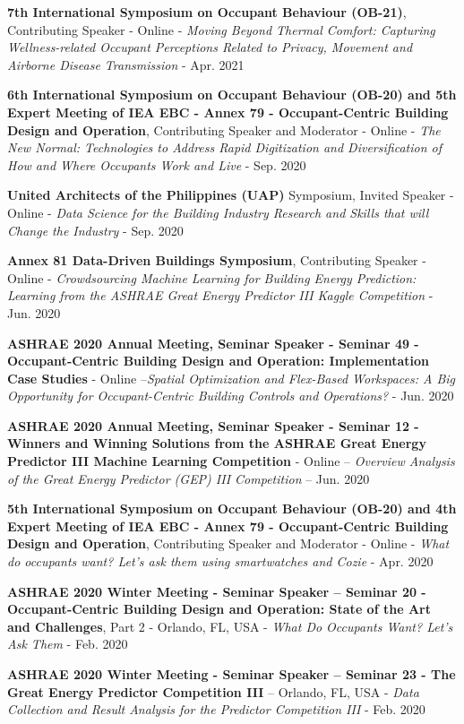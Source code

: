 \documentclass[10pt,a4paper]{article}
\begin{document}
\begin{small}
\begin{etaremune}
\item
\textbf{7th International Symposium on Occupant Behaviour (OB-21)}, Contributing Speaker - Online - \emph{Moving Beyond Thermal Comfort: Capturing Wellness-related Occupant Perceptions Related to Privacy, Movement and Airborne Disease Transmission}  - Apr. 2021
\item
\textbf{6th International Symposium on Occupant Behaviour (OB-20) and 5th Expert Meeting of IEA EBC - Annex 79 - Occupant-Centric Building Design and Operation}, Contributing Speaker and Moderator - Online - \emph{The New Normal: Technologies to Address Rapid Digitization and Diversification of How and Where Occupants Work and Live}  - Sep. 2020
\item
\textbf{United Architects of the Philippines (UAP)} Symposium, Invited Speaker - Online - \emph{Data Science for the Building Industry Research and Skills that will Change the Industry} - Sep. 2020 
\item
\textbf{Annex 81 Data-Driven Buildings Symposium}, Contributing Speaker - Online - \emph{Crowdsourcing Machine Learning for Building Energy Prediction: Learning from the ASHRAE Great Energy Predictor III Kaggle Competition} - Jun. 2020
\item
\textbf{ASHRAE 2020 Annual Meeting, Seminar Speaker - Seminar 49 - Occupant-Centric Building Design and Operation: Implementation Case Studies} - Online –\emph{Spatial Optimization and Flex-Based Workspaces: A Big Opportunity for Occupant-Centric Building Controls and Operations?} - Jun. 2020 
\item
\textbf{ASHRAE 2020 Annual Meeting, Seminar Speaker - Seminar 12 - Winners and Winning Solutions from the ASHRAE Great Energy Predictor III Machine Learning Competition} - Online – \emph{Overview Analysis of the Great Energy Predictor (GEP) III Competition} – Jun. 2020
\item
\textbf{5th International Symposium on Occupant Behaviour (OB-20) and 4th Expert Meeting of IEA EBC - Annex 79 - Occupant-Centric Building Design and Operation}, Contributing Speaker and Moderator - Online - \emph{What do occupants want? Let’s ask them using smartwatches and Cozie} - Apr. 2020
\item
\textbf{ASHRAE 2020 Winter Meeting - Seminar Speaker – Seminar 20 - Occupant-Centric Building Design and Operation: State of the Art and Challenges}, Part 2 - Orlando, FL, USA - \emph{What Do Occupants Want? Let’s Ask Them} - Feb. 2020
\item
\textbf{ASHRAE 2020 Winter Meeting - Seminar Speaker – Seminar 23 - The Great Energy Predictor Competition III} – Orlando, FL, USA - \emph{Data Collection and Result Analysis for the Predictor Competition III} - Feb. 2020

\end{etaremune}
\end{small}
\end{document}
